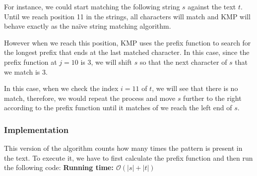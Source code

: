 For instance, we could start matching the following string $s$ against 
the text $t$. Until we reach position 11 in the strings, all
characters will match and KMP will behave exactly as the naïve string 
matching algorithm. 
\begin{figure}[h!]
\centering
{}
		
\end{figure}
However when we reach this position, KMP uses the prefix function to
search for the longest prefix that ends at the last matched character. 
In this case, since the prefix function at $j=10$ is 3, we will shift
$s$ so that the next character of $s$ that we match is 3.
\begin{figure}[h!]
\centering
{}
\end{figure}

In this case, when we check the index $i=11$ of $t$, we will see that there
is no match, therefore, we would repeat the process and move $s$ further
to the right according to the prefix function until it matches of we reach 
the left end of $s$.

\newpage
\subsubsection*{Implementation}
This version of the algorithm counts how many times the pattern is present
in the text. To execute it, we have to first calculate the prefix
function and then run the following code:
\noindent \textbf{\boldmath Running time: $\mathcal{O}(|s|+|t|)$}
\vspace{10pt}
